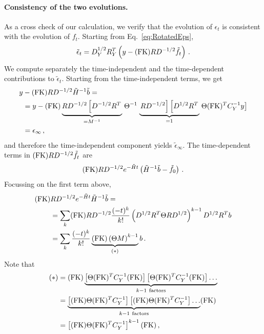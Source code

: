 \documentclass[11pt]{article}
\begin{document}
\paragraph{Consistency of the two evolutions.}
As a cross check of our calculation, we verify that the evolution of 
$\epsilon_t$ is consistent with the evolution of $f_t$. Starting from Eq.~\ref{eq:RotatedEps}, 
\begin{align}
    \label{eq:RotEpsRotF}
    \tilde\epsilon_t = D_Y^{1/2} R_Y^T 
        \left(y - (\mathrm{FK}) R D^{-1/2} \tilde{f}_t\right)\, . 
\end{align}
We compute separately the time-independent and the time-dependent contributions to $\tilde\epsilon_t$. 
Starting from the time-independent terms, we get
\begin{align}
    y &- (\mathrm{FK}) R D^{-1/2} \tilde{H}^{-1} \tilde{b} = \nonumber \\ 
    &= y - (\mathrm{FK}) \underbrace{R D^{-1/2} \left[D^{-1/2} R^T\right.}_{=M^{-1}} \left. \Theta^{-1} \right. \underbrace{\left.R D^{-1/2}\right] 
        \left[D^{1/2} R^T\right.}_{=1} \left. \Theta (\mathrm{FK})^T C_Y^{-1} y\right] \nonumber \\
    \label{eq:TimeIndepEpsCheck}
    &= \epsilon_\infty\, ,
\end{align}
and therefore the time-independent component yields $\tilde{\epsilon}_\infty$. 
The time-dependent terms in $(\mathrm{FK}) R D^{-1/2} \tilde{f}_t$ are
\begin{align}
    (\mathrm{FK}) R D^{-1/2} e^{-\tilde{H}t} \left(\tilde{H}^{-1} \tilde{b} - \tilde{f}_0\right)\, .
\end{align}
Focussing on the first term above, 
\begin{align}
    (\mathrm{FK}) &R D^{-1/2} e^{-\tilde{H}t} \tilde{H}^{-1} \tilde{b} = \nonumber \\
    & = \sum_k (\mathrm{FK}) R D^{-1/2} \frac{(-t)^k}{k!} \left(
        D^{1/2} R^T \Theta R D^{1/2}
    \right)^{k-1} D^{1/2} R^T b \nonumber \\
    & = \sum_k \frac{(-t)^k}{k!} \underbrace{(\mathrm{FK}) \left(\Theta M\right)^{k-1}}_{(*)} b\, .
\end{align}
Note that 
\begin{align}
    (*) &= \FKtab \underbrace{\left[\Theta \FKtabT C_Y^{-1} \FKtab\right] \left[\Theta \FKtabT C_Y^{-1} \FKtab\right] \ldots }_{k-1\ \mathrm{factors}} \\
    &= \underbrace{ \left[\FKtab \Theta \FKtabT C_Y^{-1}\right] \left[\FKtab\Theta \FKtabT C_Y^{-1}\right] \ldots }_{k-1\ \mathrm{factors}}  \FKtab\\
    &= \left[\FKtab \Theta \FKtabT C_Y^{-1}\right]^{k-1} \FKtab\, ,
\end{align}
\end{document}
